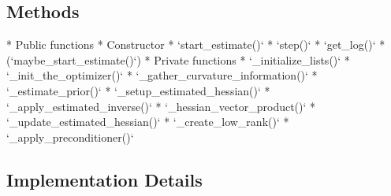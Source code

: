 \documentclass[twoside,12pt,a4paper]{report}
\begin{document}
\subsection{Methods}
\begin{markdown}
* Public functions
	* Constructor
	* `start_estimate()`
	* `step()`
	* `get_log()`
	* (`maybe_start_estimate()`)
* Private functions
	* `_initialize_lists()`
	* `_init_the_optimizer()`
	* `_gather_curvature_information()`
	* `_estimate_prior()`
	* `_setup_estimated_hessian()`
	* `_apply_estimated_inverse()`
	* `_hessian_vector_product()`
	* `_update_estimated_hessian()`
	* `_create_low_rank()`
	* `_apply_preconditioner()`
	
\end{markdown}
\subsection{Implementation Details}
\end{document}
